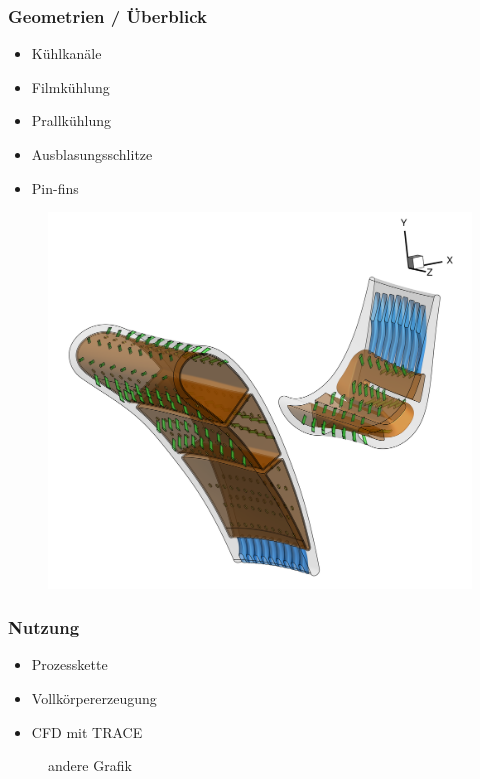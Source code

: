 \documentclass[8pt, aspectratio=169]{beamer}
\begin{document}
\begin{frame}
	\frametitle{Geometrien / Überblick}
	\vspace{-1.5cm}\hspace{-0.5cm}
	\begin{minipage}[t]{0.38\textwidth}
		\begin{itemize}
			\item[\ding{108}] Kühlkanäle
			\item[\ding{108}] Filmkühlung
			\item[\ding{108}] Prallkühlung
			\item[\ding{108}] Ausblasungsschlitze
			\item[\ding{108}] Pin-fins
		\end{itemize}
	\end{minipage}
	\begin{minipage}{0.6\textwidth}
		\begin{figure}[H]
			\centering
			\includegraphics[width=\textwidth]{../../tec/complete/60.png}
		\end{figure}
	\end{minipage}
	\vfill
\end{frame}

\begin{frame}
	\frametitle{Nutzung}
	\vspace{-1.5cm}\hspace{-0.5cm}
	\begin{minipage}[t]{0.38\textwidth}
		\begin{itemize}
			\item[\ding{109}] Prozesskette
			\item[\ding{109}] Vollkörpererzeugung
			\item[\ding{109}] CFD mit TRACE
		\end{itemize}
	\end{minipage}
	\begin{minipage}{0.6\textwidth}
		\begin{figure}[H]
			\centering
			andere Grafik
		\end{figure}
	\end{minipage}
	\vfill
\end{frame}
\end{document}
